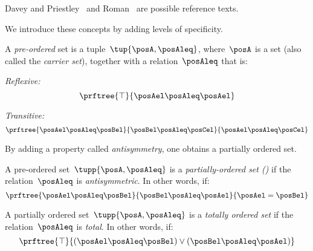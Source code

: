 Davey and Priestley~\cite{davey02}
and Roman~\cite{roman08} are possible reference texts.

We introduce these concepts by adding levels of specificity.

\begin{definition}
\label{def:preorder}
    A \emph{pre-ordered} set is a tuple~$\tup{\posA,\posAleq}$, where~$\posA$ is a set (also called the \emph{carrier set}), together with a relation~$\posAleq$ that is:
    \begin{compactitem}
        \item \emph{Reflexive:}
        \begin{equation*}
            \prftree{\top}{\posAel \posAleq \posAel}
        \end{equation*}
        \item \emph{Transitive:}
        \begin{equation*}
            \prftree{\posAel \posAleq \posBel}{\posBel \posAleq \posCel}{\posAel \posAleq \posCel}
        \end{equation*}
    \end{compactitem}
\end{definition}
By adding a property called \emph{antisymmetry}, one obtains a partially ordered set.
\begin{definition}
  \label{def:poset}
  A pre-ordered set~$\tupp{\posA,\posAleq}$ is a \emph{partially-ordered set ()} if the relation~$\posAleq$ is \emph{antisymmetric}. In other words, if:
      \begin{equation*}
          \prftree{\posAel \posAleq \posBel}{\posBel \posAleq \posAel}{\posAel = \posBel}
    \end{equation*}
\end{definition}

\begin{definition}
    \label{def:total_order}
    A partially ordered set~$\tupp{\posA,\posAleq}$ is a \emph{totally ordered set} if the relation~$\posAleq$ is \emph{total}. In other words, if:
    \begin{equation*}
        \prftree{\top}{(\posAel \posAleq \posBel) \vee (\posBel \posAleq \posAel)}
    \end{equation*}
\end{definition}

